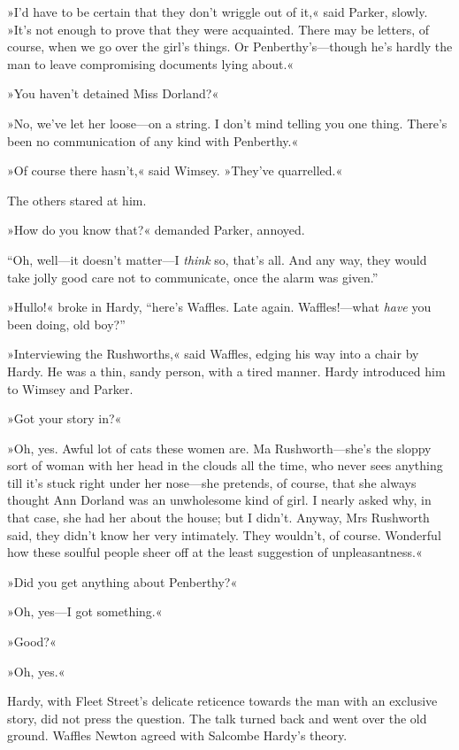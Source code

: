 »I'd have to be certain that they don't wriggle out of it,« said Parker, slowly. »It's not enough to prove that they were acquainted. There may be letters, of course, when we go over the girl's things. Or Penberthy's\allowbreak---\allowbreak though he's hardly the man to leave compromising documents lying about.«

»You haven't detained Miss Dorland?«

»No, we've let her loose\allowbreak---\allowbreak on a string. I don't mind telling you one thing. There's been no communication of any kind with Penberthy.«

»Of course there hasn't,« said Wimsey. »They've quarrelled.«

The others stared at him.

»How do you know that?« demanded Parker, annoyed.

\enquote{Oh, well\allowbreak---\allowbreak it doesn't matter\allowbreak---\allowbreak I \textit{think} so, that's all. And any way, they would take jolly good care not to communicate, once the alarm was given.}

»Hullo!« broke in Hardy, \enquote{here's Waffles. Late again. Waffles!---what \textit{have} you been doing, old boy?}

»Interviewing the Rushworths,« said Waffles, edging his way into a chair by Hardy. He was a thin, sandy person, with a tired manner. Hardy introduced him to Wimsey and Parker.

»Got your story in?«

»Oh, yes. Awful lot of cats these women are. Ma Rushworth\allowbreak---\allowbreak she's the sloppy sort of woman with her head in the clouds all the time, who never sees anything till it's stuck right under her nose\allowbreak---\allowbreak she pretends, of course, that she always thought Ann Dorland was an unwholesome kind of girl. I nearly asked why, in that case, she had her about the house; but I didn't. Anyway, Mrs Rushworth said, they didn't know her very intimately. They wouldn't, of course. Wonderful how these soulful people sheer off at the least suggestion of unpleasantness.«

»Did you get anything about Penberthy?«

»Oh, yes\allowbreak---\allowbreak I got something.«

»Good?«

»Oh, yes.«

Hardy, with Fleet Street's delicate reticence towards the man with an exclusive story, did not press the question. The talk turned back and went over the old ground. Waffles Newton agreed with Salcombe Hardy's theory.

